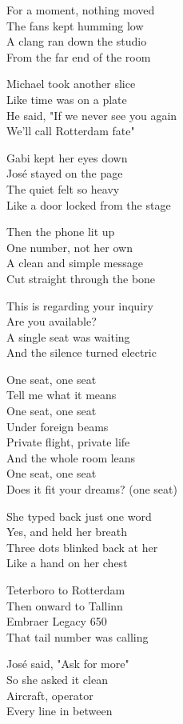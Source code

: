 \begin{lyrics}
For a moment, nothing moved\\
The fans kept humming low\\
A clang ran down the studio\\
From the far end of the room

Michael took another slice\\
Like time was on a plate\\
He said, "If we never see you again\\
We'll call Rotterdam fate"

Gabi kept her eyes down\\
José stayed on the page\\
The quiet felt so heavy\\
Like a door locked from the stage

Then the phone lit up\\
One number, not her own\\
A clean and simple message\\
Cut straight through the bone

This is regarding your inquiry\\
Are you available?\\
A single seat was waiting\\
And the silence turned electric

One seat, one seat\\
Tell me what it means\\
One seat, one seat\\
Under foreign beams\\
Private flight, private life\\
And the whole room leans\\
One seat, one seat\\
Does it fit your dreams? (one seat)

She typed back just one word\\
Yes, and held her breath\\
Three dots blinked back at her\\
Like a hand on her chest

Teterboro to Rotterdam\\
Then onward to Tallinn\\
Embraer Legacy 650\\
That tail number was calling

José said, "Ask for more"\\
So she asked it clean\\
Aircraft, operator\\
Every line in between


\end{lyrics}
